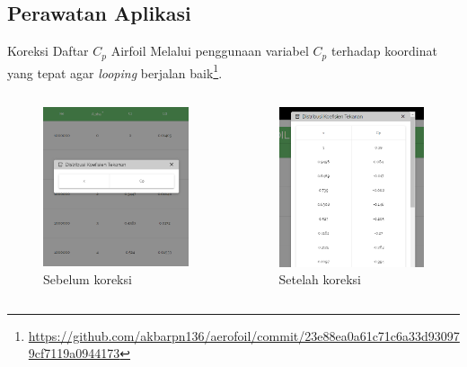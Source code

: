 \subsection{Perawatan Aplikasi}

\begin{frame}{Koreksi Daftar $C_p$ Airfoil}
  Melalui penggunaan variabel $C_p$ terhadap koordinat yang tepat agar \textit{looping} berjalan baik\footnote{\url{https://github.com/akbarpn136/aerofoil/commit/23e88ea0a61c71c6a33d930979cf7119a0944173}}.

  \begin{columns}[t]
    \begin{column}{.5\linewidth}
      \begin{figure}[h]
        \centering
        \includegraphics[width=0.4\linewidth]{statics/fix_bug_cpx}
        \caption{Sebelum koreksi}
      \end{figure}
    \end{column}

    \begin{column}{.5\linewidth}
      \begin{figure}[h]
        \centering
        \includegraphics[width=0.4\linewidth]{statics/result_cpx}
        \caption{Setelah koreksi}
      \end{figure}
    \end{column}
  \end{columns}
\end{frame}

